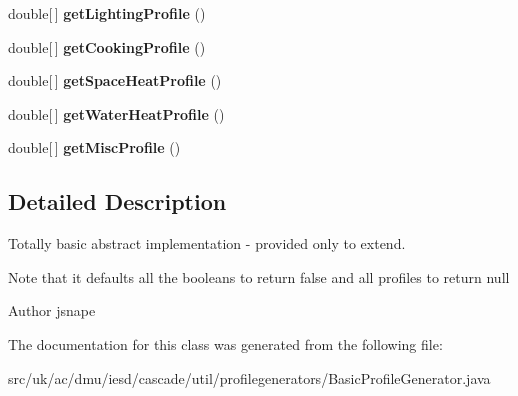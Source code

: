 \begin{DoxyCompactItemize}
\item 
\hypertarget{classuk_1_1ac_1_1dmu_1_1iesd_1_1cascade_1_1util_1_1profilegenerators_1_1_basic_profile_generator_a1753ee50469d911de5b50e5452e360e5}{double\mbox{[}$\,$\mbox{]} {\bfseries get\-Lighting\-Profile} ()}\label{classuk_1_1ac_1_1dmu_1_1iesd_1_1cascade_1_1util_1_1profilegenerators_1_1_basic_profile_generator_a1753ee50469d911de5b50e5452e360e5}

\item 
\hypertarget{classuk_1_1ac_1_1dmu_1_1iesd_1_1cascade_1_1util_1_1profilegenerators_1_1_basic_profile_generator_a0901a14f0e636ae35c9e6ed72cdb9c57}{double\mbox{[}$\,$\mbox{]} {\bfseries get\-Cooking\-Profile} ()}\label{classuk_1_1ac_1_1dmu_1_1iesd_1_1cascade_1_1util_1_1profilegenerators_1_1_basic_profile_generator_a0901a14f0e636ae35c9e6ed72cdb9c57}

\item 
\hypertarget{classuk_1_1ac_1_1dmu_1_1iesd_1_1cascade_1_1util_1_1profilegenerators_1_1_basic_profile_generator_ae2d6dc45eb54e1069c7d851f5237cee3}{double\mbox{[}$\,$\mbox{]} {\bfseries get\-Space\-Heat\-Profile} ()}\label{classuk_1_1ac_1_1dmu_1_1iesd_1_1cascade_1_1util_1_1profilegenerators_1_1_basic_profile_generator_ae2d6dc45eb54e1069c7d851f5237cee3}

\item 
\hypertarget{classuk_1_1ac_1_1dmu_1_1iesd_1_1cascade_1_1util_1_1profilegenerators_1_1_basic_profile_generator_abdb697cbf2cdf0940689a7f8eb6cebda}{double\mbox{[}$\,$\mbox{]} {\bfseries get\-Water\-Heat\-Profile} ()}\label{classuk_1_1ac_1_1dmu_1_1iesd_1_1cascade_1_1util_1_1profilegenerators_1_1_basic_profile_generator_abdb697cbf2cdf0940689a7f8eb6cebda}

\item 
\hypertarget{classuk_1_1ac_1_1dmu_1_1iesd_1_1cascade_1_1util_1_1profilegenerators_1_1_basic_profile_generator_a9995b6ccb854ea28cd24bc7b98402a01}{double\mbox{[}$\,$\mbox{]} {\bfseries get\-Misc\-Profile} ()}\label{classuk_1_1ac_1_1dmu_1_1iesd_1_1cascade_1_1util_1_1profilegenerators_1_1_basic_profile_generator_a9995b6ccb854ea28cd24bc7b98402a01}

\end{DoxyCompactItemize}


\subsection{Detailed Description}
Totally basic abstract implementation -\/ provided only to extend. 

Note that it defaults all the booleans to return false and all profiles to return null

\begin{DoxyAuthor}{Author}
jsnape 
\end{DoxyAuthor}


The documentation for this class was generated from the following file\-:\begin{DoxyCompactItemize}
\item 
src/uk/ac/dmu/iesd/cascade/util/profilegenerators/Basic\-Profile\-Generator.\-java\end{DoxyCompactItemize}
